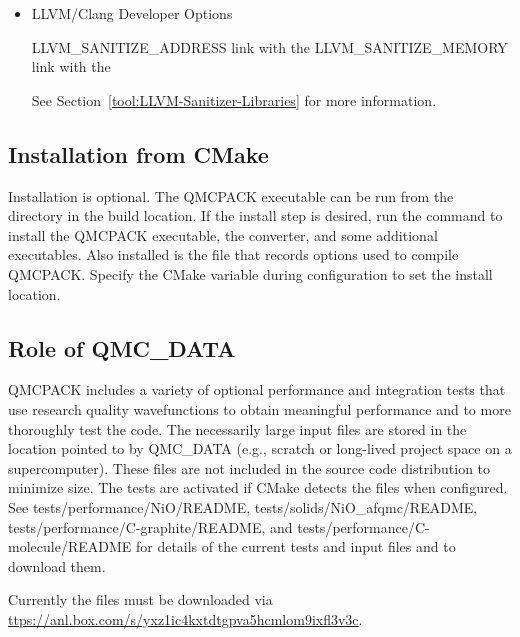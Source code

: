 \begin{itemize}
\item LLVM/Clang Developer Options\\
\begin{shade}
LLVM_SANITIZE_ADDRESS     link with the %
LLVM_SANITIZE_MEMORY      link with the %
\end{shade}

See Section~\ref{tool:LLVM-Sanitizer-Libraries} for more information.
\end{itemize}

\subsection{Installation from CMake}
Installation is optional. The QMCPACK executable can be run from the  directory in the build location.
If the install step is desired, run the  command to install the QMCPACK executable, the converter,
and some additional executables.
Also installed is the  file that records options used to compile QMCPACK.
Specify the  CMake variable during configuration to set the install location.


\subsection{Role of QMC\_DATA}
QMCPACK includes a variety of optional performance and integration
tests that use research quality wavefunctions to obtain meaningful
performance and to more thoroughly test the code. The necessarily
large input files are stored in the location pointed to by QMC\_DATA (e.g., scratch or long-lived project space on a supercomputer). These
files are not included in the source code distribution to minimize
size. The tests are activated if CMake detects the files when
configured. See tests/performance/NiO/README,
tests/solids/NiO\_afqmc/README, tests/performance/C-graphite/README, and tests/performance/C-molecule/README
for details of the current tests and input files and to download them.

Currently the files must be downloaded via
\url{ttps://anl.box.com/s/yxz1ic4kxtdtgpva5hcmlom9ixfl3v3c}.

